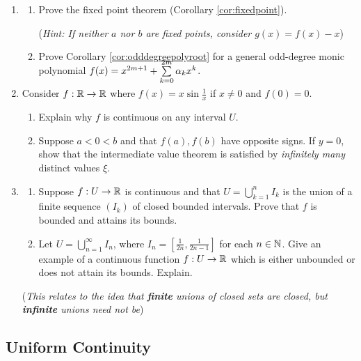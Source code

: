\begin{exercises}{}{}
\begin{enumerate}
	  
	 	\item\begin{enumerate}
	 	  \item Prove the fixed point theorem (Corollary \ref{cor:fixedpoint}).\par
	 	  (\emph{Hint: If neither $a$ nor $b$ are fixed points, consider $g(x)=f(x)-x$}) 
	 	  
	 	  \item Prove Corollary \ref{cor:odddegreepolyroot} for a general odd-degree monic polynomial $f(x)=x^{2m+1}+\smash{\sum\limits_{k=0}^{2m}\alpha_kx^k}$. 
	 	\end{enumerate}
	 	

		\item Consider $f:\mathbb{R}\to\mathbb{R}$ where $f(x)=x\sin\frac 1x$ if $x\neq 0$ and $f(0)=0$.
		\begin{enumerate}
		  \item Explain why $f$ is continuous on any interval $U$.
		  \item Suppose $a<0<b$ and that $f(a),f(b)$ have opposite signs. If $y=0$, show that the intermediate value theorem is satisfied by \emph{infinitely many} distinct values $\xi$.
		\end{enumerate}
		
		
		\item\begin{enumerate}
		  \item Suppose $f:U\to\mathbb{R}$ is continuous and that $U=\bigcup\limits_{k=1}^nI_k$ is the union of a finite sequence $(I_k)$ of closed bounded intervals. Prove that $f$ is bounded and attains its bounds.
		  
		  \item Let $U=\bigcup\limits_{n=1}^\infty I_n$, where $I_n=[\frac 1{2n},\frac 1{2n-1}]$ for each $n\in\mathbb{N}$. Give an example of a continuous function $f:U\to\mathbb{R}$ which is either unbounded or does not attain its bounds. Explain.
		\end{enumerate}
		(\emph{This relates to the idea that \textbf{finite} unions of closed sets are closed, but \textbf{infinite} unions need not be})
	\end{enumerate}
\end{exercises}



\clearpage


\subsection{Uniform Continuity}\label{sec:uniformcont}

